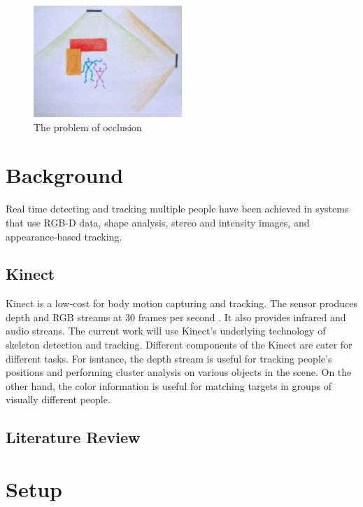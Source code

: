 \documentclass[paper=a4, fontsize=11pt]{scrartcl}
\numberwithin{equation}{section}		%
\numberwithin{figure}{section}			%
\numberwithin{table}{section}				%
\begin{document}
\begin{figure}[H]
	\centering
	\includegraphics[width=0.5\textwidth]{occlusion_description}
	\caption{The problem of occlusion}
	\label{fig:occlusion_description}
\end{figure}

\section{Background}

Real time detecting and tracking multiple people have been achieved in systems that use RGB-D data\cite{track_rgbd}, shape analysis, stereo and intensity images\cite{w4s}, and appearance-based tracking\cite{track_robust}.

\subsection{Kinect}

Kinect is a low-cost for body motion capturing and tracking. The sensor produces depth and RGB streams at 30 frames per second \cite{kinect_sensor_specs}. It also provides infrared and audio streans. The current work will use Kinect's underlying technology of skeleton detection and tracking. Different components of the Kinect are cater for different tasks. For isntance, the depth stream is useful for tracking people's positions and performing cluster analysis on various objects in the scene. On the other hand, the color information is useful for matching targets in groups of visually different people.

\subsection{Literature Review}


\section{Setup}
\end{document}

